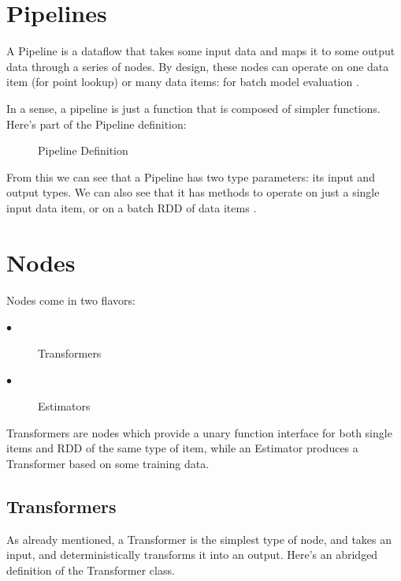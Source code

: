 \documentclass[9pt,twocolumn,twoside]{../../styles/osajnl}
\begin{document}
\section{Pipelines}

A Pipeline is a dataflow that takes some input data and maps it to
some output data through a series of nodes. By design, these nodes can
operate on one data item (for point lookup) or many data items: for
batch model evaluation \cite{www-keystoneml1} .

In a sense, a pipeline is just a function that is composed of simpler
functions. Here’s part of the Pipeline definition:

\begin{figure}[htbp]
\centering
{}
\caption{Pipeline Definition}
\label{fig:Pipeline Definition}
\end{figure}



From this we can see that a Pipeline has two type parameters: its
input and output types. We can also see that it has methods to operate
on just a single input data item, or on a batch RDD of data items \cite{www-keystoneml1} .

\section{Nodes}

Nodes come in two flavors:

\begin{description}
\item[$\bullet$] Transformers
\item[$\bullet$] Estimators
\end{description}

Transformers are nodes which provide a unary function interface for
both single items and RDD of the same type of item, while an Estimator
produces a Transformer based on some training data.
\subsection{Transformers}

As already mentioned, a Transformer is the simplest type of node, and
takes an input, and deterministically transforms it into an
output. Here’s an abridged definition of the Transformer class.
\end{document}

